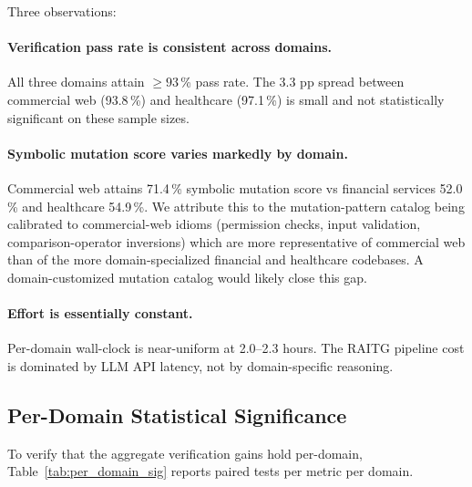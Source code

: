 \documentclass[10pt,twocolumn,letterpaper]{article}
\begin{document}
Three observations:

\paragraph{Verification pass rate is consistent across domains.} All
three domains attain $\geq 93$\,\% pass rate. The 3.3 pp spread
between commercial web (93.8\,\%) and healthcare (97.1\,\%) is small
and not statistically significant on these sample sizes.

\paragraph{Symbolic mutation score varies markedly by domain.}
Commercial web attains 71.4\,\% symbolic mutation score vs financial
services 52.0\,\% and healthcare 54.9\,\%. We attribute this to the
mutation-pattern catalog being calibrated to commercial-web idioms
(permission checks, input validation, comparison-operator inversions)
which are more representative of commercial web than of the more
domain-specialized financial and healthcare codebases. A
domain-customized mutation catalog would likely close this gap.

\paragraph{Effort is essentially constant.} Per-domain wall-clock is
near-uniform at 2.0--2.3 hours. The RAITG pipeline cost is dominated
by LLM API latency, not by domain-specific reasoning.

\subsection{Per-Domain Statistical Significance}
\label{sec:per_domain_sig}

To verify that the aggregate verification gains hold per-domain,
Table~\ref{tab:per_domain_sig} reports paired tests per metric per
domain.
\end{document}
